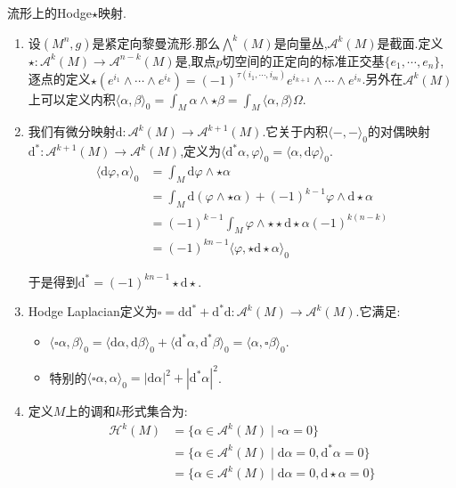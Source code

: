 流形上的Hodge$\star$映射.
\begin{enumerate}
	\item 设$(M^n,g)$是紧定向黎曼流形.那么$\bigwedge^k(M)$是向量丛,$\mathscr{A}^k(M)$是截面.定义$\star:\mathscr{A}^k(M)\to\mathscr{A}^{n-k}(M)$是,取点$p$切空间的正定向的标准正交基$\{e_1,\cdots,e_n\}$,逐点的定义$\star(e^{i_1}\wedge\cdots\wedge e^{i_k})=(-1)^{\tau(i_1,\cdots,i_m)}e^{i_{k+1}}\wedge\cdots\wedge e^{i_n}$.另外在$\mathscr{A}^k(M)$上可以定义内积$\langle\alpha,\beta\rangle_0=\int_M\alpha\wedge\star\beta=\int_M\langle\alpha,\beta\rangle\Omega$.
	\item 我们有微分映射$\mathrm{d}:\mathscr{A}^k(M)\to\mathscr{A}^{k+1}(M)$.它关于内积$\langle-,-\rangle_0$的对偶映射$\mathrm{d}^*:\mathscr{A}^{k+1}(M)\to\mathscr{A}^k(M)$,定义为$\langle\mathrm{d}^*\alpha,\varphi\rangle_0=\langle\alpha,\mathrm{d}\varphi\rangle_0$.
	\begin{align*}
		\langle\mathrm{d}\varphi,\alpha\rangle_0&=\int_M\mathrm{d}\varphi\wedge\star\alpha\\&=\int_M\mathrm{d}(\varphi\wedge\star\alpha)+(-1)^{k-1}\varphi\wedge\mathrm{d}\star\alpha\\&=(-1)^{k-1}\int_M\varphi\wedge\star\star\mathrm{d}\star\alpha(-1)^{k(n-k)}\\&=(-1)^{kn-1}\langle\varphi,\star\mathrm{d}\star\alpha\rangle_0
	\end{align*}
	
	于是得到$\mathrm{d}^*=(-1)^{kn-1}\star\mathrm{d}\star$.
	\item Hodge Laplacian定义为$\square=\mathrm{d}\mathrm{d}^*+\mathrm{d}^*\mathrm{d}:\mathscr{A}^k(M)\to\mathscr{A}^k(M)$.它满足:
	\begin{itemize}
		\item $\langle\square\alpha,\beta\rangle_0=\langle\mathrm{d}\alpha,\mathrm{d}\beta\rangle_0+\langle\mathrm{d}^*\alpha,\mathrm{d}^*\beta\rangle_0=\langle\alpha,\square\beta\rangle_0$.
		\item 特别的$\langle\square\alpha,\alpha\rangle_0=|\mathrm{d}\alpha|^2+|\mathrm{d}^*\alpha|^2$.
	\end{itemize}
    \item 定义$M$上的调和$k$形式集合为:
    \begin{align*}
    	\mathscr{H}^k(M)&=\{\alpha\in\mathscr{A}^k(M)\mid\square\alpha=0\}\\&=\{\alpha\in\mathscr{A}^k(M)\mid\mathrm{d}\alpha=0,\mathrm{d}^*\alpha=0\}\\&=\{\alpha\in\mathscr{A}^k(M)\mid\mathrm{d}\alpha=0,\mathrm{d}\star\alpha=0\}
    \end{align*}
\end{enumerate}


